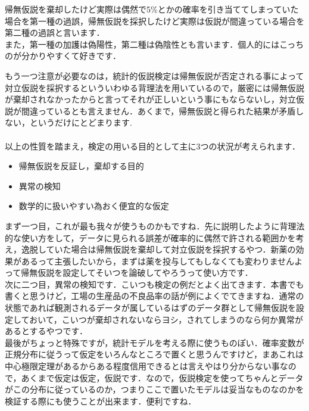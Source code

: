 \documentclass[11pt,a4paper]{ujreport} 	%
\begin{document}
帰無仮説を棄却したけど実際は偶然で5\%とかの確率を引き当ててしまっていた場合を第一種の過誤，帰無仮説を採択したけど実際は仮説が間違っている場合を第二種の過誤と言います．\\

また，第一種の加護は偽陽性，第二種は偽陰性とも言います．個人的にはこっちのが分かりやすくて好きです．

もう一つ注意が必要なのは，統計的仮説検定は帰無仮説が否定される事によって対立仮説を採択するといういわゆる背理法を用いているので，厳密には帰無仮説が棄却されなかったからと言ってそれが正しいという事にもならないし，対立仮説が間違っているとも言えません．あくまで，帰無仮説と得られた結果が矛盾しない，というだけにとどまります. \\\\

以上の性質を踏まえ，検定の用いる目的として主に3つの状況が考えられます．\\

\begin{itemize}
  \item 帰無仮説を反証し，棄却する目的
  \item 異常の検知
  \item 数学的に扱いやすい為おく便宜的な仮定
\end{itemize}

まず一つ目，これが最も我々が使うものかもですね．先に説明したように背理法的な使い方をして，データに見られる誤差が確率的に偶然で許される範囲かを考え，逸脱していた場合は帰無仮説を棄却して対立仮説を採択するやつ．新薬の効果があるって主張したいから，まずは薬を投与してもしなくても変わりませんよって帰無仮説を設定してそいつを論破してやろうって使い方です．\\

次に二つ目，異常の検知です．こいつも検定の例だとよく出てきます．本書でも書くと思うけど，工場の生産品の不良品率の話が例によくでてきますね．通常の状態であれば観測されるデータが属しているはずのデータ群として帰無仮説を設定しておいて，こいつが棄却されないならヨシ，されてしまうのなら何か異常があるとするやつです．\\

最後がちょっと特殊ですが，統計モデルを考える際に使うものぽい．確率変数が正規分布に従うって仮定をいろんなところで置くと思うんですけど，まあこれは中心極限定理があるからある程度信用できるとは言えやはり分からない事なので，あくまで仮定は仮定，仮説です．なので，仮説検定を使ってちゃんとデータがこの分布に従っているのか，つまりここで置いたモデルは妥当なものなのかを検証する際にも使うことが出来ます．便利ですね．
\end{document}
